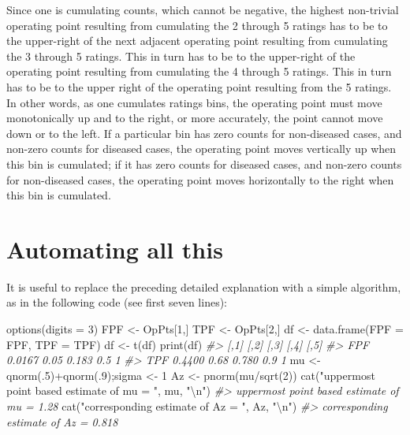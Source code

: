 \documentclass[
]{book}
\newenvironment{Shaded}{\begin{snugshade}}{\end{snugshade}}
\newcommand{\AttributeTok}[1]{\textcolor[rgb]{0.77,0.63,0.00}{#1}}
\newcommand{\CommentTok}[1]{\textcolor[rgb]{0.56,0.35,0.01}{\textit{#1}}}
\newcommand{\DecValTok}[1]{\textcolor[rgb]{0.00,0.00,0.81}{#1}}
\newcommand{\FunctionTok}[1]{\textcolor[rgb]{0.00,0.00,0.00}{#1}}
\newcommand{\NormalTok}[1]{#1}
\newcommand{\OtherTok}[1]{\textcolor[rgb]{0.56,0.35,0.01}{#1}}
\newcommand{\SpecialCharTok}[1]{\textcolor[rgb]{0.00,0.00,0.00}{#1}}
\newcommand{\StringTok}[1]{\textcolor[rgb]{0.31,0.60,0.02}{#1}}
\begin{document}
Since one is cumulating counts, which cannot be negative, the highest non-trivial operating point resulting from cumulating the 2 through 5 ratings has to be to the upper-right of the next adjacent operating point resulting from cumulating the 3 through 5 ratings. This in turn has to be to the upper-right of the operating point resulting from cumulating the 4 through 5 ratings. This in turn has to be to the upper right of the operating point resulting from the 5 ratings. In other words, as one cumulates ratings bins, the operating point must move monotonically up and to the right, or more accurately, the point cannot move down or to the left. If a particular bin has zero counts for non-diseased cases, and non-zero counts for diseased cases, the operating point moves vertically up when this bin is cumulated; if it has zero counts for diseased cases, and non-zero counts for non-diseased cases, the operating point moves horizontally to the right when this bin is cumulated.

\hypertarget{ratings-task-automating}{%
\section{Automating all this}\label{ratings-task-automating}}

It is useful to replace the preceding detailed explanation with a simple algorithm, as in the following code (see first seven lines):

\begin{Shaded}
\begin{Highlighting}[]
\FunctionTok{options}\NormalTok{(}\AttributeTok{digits =} \DecValTok{3}\NormalTok{)}
\NormalTok{FPF }\OtherTok{\textless{}{-}}\NormalTok{ OpPts[}\DecValTok{1}\NormalTok{,]}
\NormalTok{TPF }\OtherTok{\textless{}{-}}\NormalTok{ OpPts[}\DecValTok{2}\NormalTok{,]}
\NormalTok{df }\OtherTok{\textless{}{-}} \FunctionTok{data.frame}\NormalTok{(}\AttributeTok{FPF =}\NormalTok{ FPF, }\AttributeTok{TPF =}\NormalTok{ TPF)}
\NormalTok{df }\OtherTok{\textless{}{-}} \FunctionTok{t}\NormalTok{(df)}
\FunctionTok{print}\NormalTok{(df)}
\CommentTok{\#\textgreater{}       [,1] [,2]  [,3] [,4] [,5]}
\CommentTok{\#\textgreater{} FPF 0.0167 0.05 0.183  0.5    1}
\CommentTok{\#\textgreater{} TPF 0.4400 0.68 0.780  0.9    1}
\NormalTok{mu }\OtherTok{\textless{}{-}} \FunctionTok{qnorm}\NormalTok{(.}\DecValTok{5}\NormalTok{)}\SpecialCharTok{+}\FunctionTok{qnorm}\NormalTok{(.}\DecValTok{9}\NormalTok{);sigma }\OtherTok{\textless{}{-}} \DecValTok{1}
\NormalTok{Az }\OtherTok{\textless{}{-}} \FunctionTok{pnorm}\NormalTok{(mu}\SpecialCharTok{/}\FunctionTok{sqrt}\NormalTok{(}\DecValTok{2}\NormalTok{))}
\FunctionTok{cat}\NormalTok{(}\StringTok{"uppermost point based estimate of mu = "}\NormalTok{, mu, }\StringTok{"}\SpecialCharTok{\textbackslash{}n}\StringTok{"}\NormalTok{)}
\CommentTok{\#\textgreater{} uppermost point based estimate of mu =  1.28}
\FunctionTok{cat}\NormalTok{(}\StringTok{"corresponding estimate of Az = "}\NormalTok{, Az, }\StringTok{"}\SpecialCharTok{\textbackslash{}n}\StringTok{"}\NormalTok{)}
\CommentTok{\#\textgreater{} corresponding estimate of Az =  0.818}
\end{Highlighting}
\end{Shaded}
\end{document}
